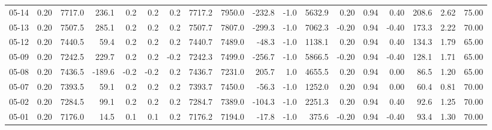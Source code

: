 \begin{threeparttable}
{\begin{tabular}{lrrrrrrrrrrrrrrrrr}
  05-14 &     0.20 & 7717.0 &             236.1 &               0.2 &                0.2 &                0.2 & 7717.2 & 7950.0 &     -232.8 &                     -1.0 &              5632.9 &       0.20 &      0.94 &           0.40 &            208.6 &            2.62 &                  75.00 \\
  05-13 &     0.20 & 7507.5 &             285.1 &               0.2 &                0.2 &                0.2 & 7507.7 & 7807.0 &     -299.3 &                     -1.0 &              7062.3 &      -0.20 &      0.94 &          -0.40 &            173.3 &            2.22 &                  70.00 \\
  05-12 &     0.20 & 7440.5 &              59.4 &               0.2 &                0.2 &                0.2 & 7440.7 & 7489.0 &      -48.3 &                     -1.0 &              1138.1 &       0.20 &      0.94 &           0.40 &            134.3 &            1.79 &                  65.00 \\
  05-09 &     0.20 & 7242.5 &             229.7 &               0.2 &                0.2 &               -0.2 & 7242.3 & 7499.0 &     -256.7 &                     -1.0 &              5866.5 &      -0.20 &      0.94 &          -0.40 &            128.1 &            1.71 &                  65.00 \\
  05-08 &     0.20 & 7436.5 &            -189.6 &              -0.2 &               -0.2 &                0.2 & 7436.7 & 7231.0 &      205.7 &                      1.0 &              4655.5 &       0.20 &      0.94 &           0.00 &             86.5 &            1.20 &                  65.00 \\
  05-07 &     0.20 & 7393.5 &              59.1 &               0.2 &                0.2 &                0.2 & 7393.7 & 7450.0 &      -56.3 &                     -1.0 &              1252.0 &       0.20 &      0.94 &           0.00 &             60.4 &            0.81 &                  70.00 \\
  05-02 &     0.20 & 7284.5 &              99.1 &               0.2 &                0.2 &                0.2 & 7284.7 & 7389.0 &     -104.3 &                     -1.0 &              2251.3 &       0.20 &      0.94 &           0.40 &             92.6 &            1.25 &                  70.00 \\
  05-01 &     0.20 & 7176.0 &              14.5 &               0.1 &                0.1 &                0.2 & 7176.2 & 7194.0 &      -17.8 &                     -1.0 &               375.6 &      -0.20 &      0.94 &          -0.40 &             93.4 &            1.30 &                  70.00 \\

\end{tabular}}
\end{threeparttable}
